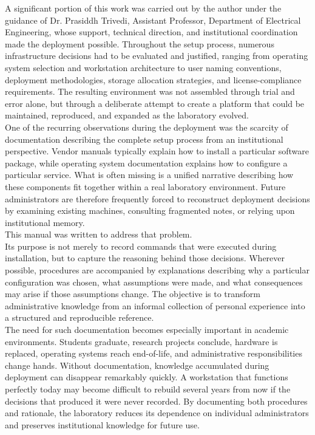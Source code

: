 A significant portion of this work was carried out by the author under the guidance of Dr. Prasiddh Trivedi, Assistant Professor, Department of Electrical Engineering, whose support, technical direction, and institutional coordination made the deployment possible. Throughout the setup process, numerous infrastructure decisions had to be evaluated and justified, ranging from operating system selection and workstation architecture to user naming conventions, deployment methodologies, storage allocation strategies, and license-compliance requirements. The resulting environment was not assembled through trial and error alone, but through a deliberate attempt to create a platform that could be maintained, reproduced, and expanded as the laboratory evolved. \\

One of the recurring observations during the deployment was the scarcity of documentation describing the complete setup process from an institutional perspective. Vendor manuals typically explain how to install a particular software package, while operating system documentation explains how to configure a particular service. What is often missing is a unified narrative describing how these components fit together within a real laboratory environment. Future administrators are therefore frequently forced to reconstruct deployment decisions by examining existing machines, consulting fragmented notes, or relying upon institutional memory. \\

This manual was written to address that problem. \\

Its purpose is not merely to record commands that were executed during installation, but to capture the reasoning behind those decisions. Wherever possible, procedures are accompanied by explanations describing why a particular configuration was chosen, what assumptions were made, and what consequences may arise if those assumptions change. The objective is to transform administrative knowledge from an informal collection of personal experience into a structured and reproducible reference. \\

The need for such documentation becomes especially important in academic environments. Students graduate, research projects conclude, hardware is replaced, operating systems reach end-of-life, and administrative responsibilities change hands. Without documentation, knowledge accumulated during deployment can disappear remarkably quickly. A workstation that functions perfectly today may become difficult to rebuild several years from now if the decisions that produced it were never recorded. By documenting both procedures and rationale, the laboratory reduces its dependence on individual administrators and preserves institutional knowledge for future use.\\

